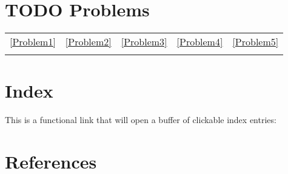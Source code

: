 \documentclass[11pt]{article}
\begin{document}
\section{{\bfseries\sffamily TODO} Problems}
\label{sec:org3abc175}
\begin{center}
\begin{tabular}{lllll}
\ref{Problem1} & \ref{Problem2} & \ref{Problem3} & \ref{Problem4} & \ref{Problem5}\\
 &  &  &  & \\
\end{tabular}
\end{center}

\section{Index}
\label{sec:orgcb761ff}

This is a functional link that will open a buffer of clickable index entries:

\renewcommand{\indexname}{}
\printindex

\section{References}
\label{sec:orgc5bfdf4}

\label{bibliographystyle link}


\label{bibliography link}

\end{document}
